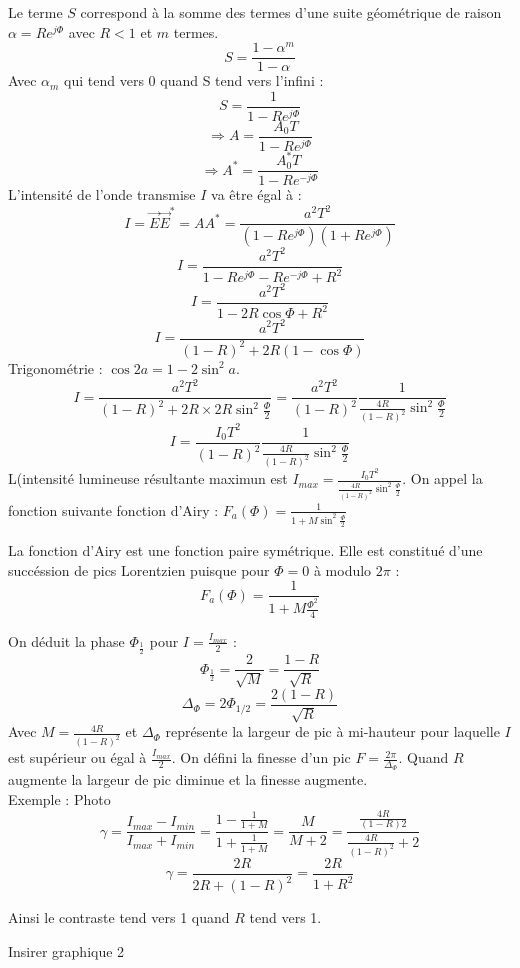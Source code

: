 \documentclass[a4paper,12pt]{article}
\theoremstyle{StyleTheo_will}
\theoremstyle{remark}
\begin{document}
Le terme $S$ correspond à la somme des termes d'une suite géométrique de raison $\alpha = Re^{j\varPhi}$ avec $R<1$ et $m$ termes.
\[S =\frac{ 1-\alpha^m}{1-\alpha}\]
Avec $\alpha_m$ qui tend vers 0 quand S tend vers l'infini : 
\[S  = \frac{1}{1 - Re^{j\varPhi}}\]
\[\Rightarrow A = \frac{A_0T}{1 - Re^{j\varPhi}}\]
\[\Rightarrow A^* = \frac{A_0^*T}{1 - Re^{-j\varPhi}}\]
L'intensité de l'onde transmise $I$ va être égal à : \[ I = \overrightarrow{E} \overrightarrow{E}^* = AA^* = \frac{a^2T^2}{(1 - Re^{j\varPhi})(1 + Re^{j\varPhi})}\]
\[ I = \frac{a^2T^2}{1 - Re^{j\varPhi} - Re^{-j\varPhi} + R^2}\]
\[ I = \frac{a^2T^2}{1 - 2R\cos \varPhi + R^2}\]
\[ I = \frac{a^2T^2}{(1 - R)^2 +2R(1- \cos \varPhi)}\]
Trigonométrie : $ \cos 2a = 1 - 2 \sin^2 a$.
\[I = \frac{a^2T^2}{(1 - R)^2 +2R \times 2R \sin^2\frac{\varPhi}{2}} = \frac{a^2T^2}{(1 - R)^2}\frac{1}{\frac{4R}{(1-R)^2}\sin^2\frac{\varPhi}{2}}\]
\[I =\frac{I_0T^2}{(1 - R)^2}\frac{1}{\frac{4R}{(1-R)^2}\sin^2\frac{\varPhi}{2}}\]
L(intensité lumineuse résultante maximun est $I_{max} = \frac{I_0T^2}{\frac{4R}{(1-R)^2}\sin^2\frac{\varPhi}{2}}$. On appel la fonction suivante fonction d'Airy : $F_a(\varPhi) = \frac{1}{1 + M\sin^2\frac{\varPhi}{2}}$

La fonction d'Airy est une fonction paire symétrique. Elle est constitué d'une succéssion de pics Lorentzien puisque pour $\varPhi = 0$ à modulo $2\pi$ :
\[F_a(\varPhi) = \frac{1}{1 + M\frac{\varPhi^2}{4}}\]

On déduit la phase $\varPhi_{\frac{1}{2}}$ pour $I = \frac{I_{max}}{2}$ : 
\[\varPhi_{\frac{1}{2}} = \frac{2}{\sqrt{M}} = \frac{1-R}{\sqrt{R}}\]
\[\varDelta_\varPhi = 2 \varPhi_{1/2} = \frac{2(1 -R)}{\sqrt{R}}\]
Avec $M = \frac{4R}{(1 - R)^2}$ et $\Delta_\varPhi$ représente la largeur de pic à mi-hauteur pour laquelle $I$ est supérieur ou égal à $\frac{I_{max}}{2}$. On défini la finesse d'un pic $F = \frac{2\pi}{\Delta_\varPhi}$. Quand $R$ augmente la largeur de pic diminue et la finesse augmente.\\
Exemple : Photo
\[\gamma = \frac{I_{max} - I_{min}}{I_{max} + I_{min}} = \frac{1 - \frac{1}{1+M}}{1 + \frac{1}{1+M}} = \frac{M}{M + 2} = \frac{\frac{4R}{(1 - R)2}}{\frac{4R}{(1 -R)^2} + 2}\]
\[\gamma = \frac{2R}{2R + (1- R)^2} = \frac{2R}{1+R^2}\]

Ainsi le contraste tend vers 1 quand $R$ tend vers 1.

Insirer graphique 2
\end{document}
